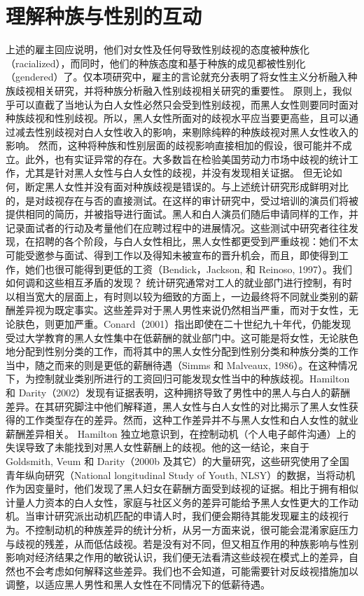 \documentclass[UTF8]{ctexart}
\begin{document}
\section{理解种族与性别的互动}上述的雇主回应说明，他们对女性及任何导致性别歧视的态度被种族化（racialized），而同时，他们的种族态度和基于种族的成见都被性别化（gendered）了。仅本项研究中，雇主的言论就充分表明了将女性主义分析融入种族歧视相关研究，并将种族分析融入性别歧视相关研究的重要性。\cite{09}
原则上，我似乎可以直截了当地认为白人女性必然只会受到性别歧视，而黑人女性则要同时面对种族歧视和性别歧视。所以，黑人女性所面对的歧视水平应当要更高些，且可以通过减去性别歧视对白人女性收入的影响，来剔除纯粹的种族歧视对黑人女性收入的影响。
然而，这种将种族和性别层面的歧视影响直接相加的假设，很可能并不成立。此外，也有实证异常的存在。大多数旨在检验美国劳动力市场中歧视的统计工作，尤其是针对黑人女性与白人女性的歧视，并没有发现相关证据。\cite{10}
但无论如何，断定黑人女性并没有面对种族歧视是错误的。与上述统计研究形成鲜明对比的，是对歧视存在与否的直接测试。在这样的审计研究中，受过培训的演员们将被提供相同的简历，并被指导进行面试。黑人和白人演员们随后申请同样的工作，并记录面试者的行动及考量他们在应聘过程中的进展情况。这些测试中研究者往往发现，在招聘的各个阶段，与白人女性相比，黑人女性都更受到严重歧视：她们不太可能受邀参与面试、得到工作以及得知未被宣布的晋升机会，而且，即使得到工作，她们也很可能得到更低的工资（Bendick，Jackson, 和 Reinoso, 1997）。我们如何调和这些相互矛盾的发现？
统计研究通常对工人的就业部门进行控制，有时以相当宽大的层面上，有时则以较为细致的方面上，一边最终将不同就业类别的薪酬差异视为既定事实。这些差异对于黑人男性来说仍然相当严重，而对于女性，无论肤色，则更加严重。Conard（2001）指出即使在二十世纪九十年代，仍能发现受过大学教育的黑人女性集中在低薪酬的就业部门中。这可能是将女性，无论肤色地分配到性别分类的工作，而将其中的黑人女性分配到性别分类和种族分类的工作当中，随之而来的则是更低的薪酬待遇（Simms 和 Malveaux, 1986）。在这种情况下，为控制就业类别所进行的工资回归可能发现女性当中的种族歧视。Hamilton 和 Darity（2002）发现有证据表明，这种拥挤导致了男性中的黑人与白人的薪酬差异。在其研究脚注中他们解释道，黑人女性与白人女性的对比揭示了黑人女性获得的工作类型存在的差异。然而，这种工作差异并不与黑人女性和白人女性的就业薪酬差异相关。
Hamilton 独立地意识到，在控制动机（个人电子邮件沟通）上的失误导致了未能找到对黑人女性薪酬上的歧视。他的这一结论，来自于 Goldsmith, Veum 和 Darity（2000b 及其它）的大量研究，这些研究使用了全国青年纵向研究（National longitudinal Study of Youth, NLSY）的数据，当将动机作为因变量时，他们发现了黑人妇女在薪酬方面受到歧视的证据。相比于拥有相似计量人力资本的白人女性，家庭与社区义务的差异可能给予黑人女性更大的工作动机。当审计研究派出动机匹配的申请人时，我们便会期待其能发现雇主的歧视行为。不控制动机的种族差异的统计分析，从另一方面来说，很可能会混淆家庭压力与歧视的残差，从而低估歧视。若是没有对不同，但又相互作用的种族影响与性别影响对经济结果之作用的敏锐认识，我们便无法看清这些歧视在模式上的差异，自然也不会考虑如何解释这些差异。我们也不会知道，可能需要针对反歧视措施加以调整，以适应黑人男性和黑人女性在不同情况下的低薪待遇。
\end{document}

